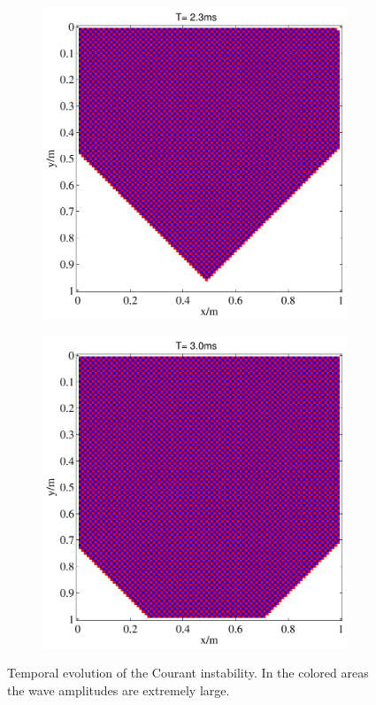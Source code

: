 \begin{figure}[htb!]
\begin{subfigure}[b]{0.45\textwidth}
        \caption{}
    \end{subfigure}
    \vfill
    \begin{subfigure}[b]{0.45\textwidth}
        \centering
        \includegraphics[width=\textwidth]{figures/courandt_3.pdf}
        \caption{}
    \end{subfigure}
    \hfill
    \begin{subfigure}[b]{0.45\textwidth}
        \centering
        \includegraphics[width=\textwidth]{figures/courandt_4.pdf}
        \caption{}
    \end{subfigure}
    \caption{\label{courant_pics} Temporal evolution of the Courant instability. In the colored areas the wave amplitudes are extremely large.}
\label{fig_courant}
\end{figure}

